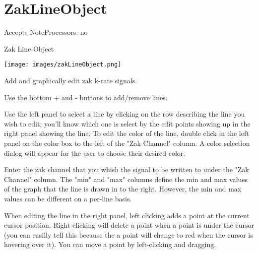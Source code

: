 \section{ZakLineObject}\label{zakLineObject}

Accepts NoteProcessors: no

Zak Line Object

\texttt{[image: images/zakLineObject.png]}

Add and graphically edit zak k-rate signals.

Use the bottom + and - buttons to add/remove lines.

Use the left panel to select a line by clicking on the row describing
the line you wish to edit; you'll know which one is select by the edit
points showing up in the right panel showing the line. To edit the color
of the line, double click in the left panel on the color box to the left
of the "Zak Channel" column. A color selection dialog will appear for
the user to choose their desired color.

Enter the zak channel that you whish the signal to be written to under
the "Zak Channel" column. The "min" and "max" columns define the min and
max values of the graph that the line is drawn in to the right. However,
the min and max values can be different on a per-line basis.

When editing the line in the right panel, left clicking adds a point at
the current cursor position. Right-clicking will delete a point when a
point is under the cursor (you can easilly tell this because the a point
will change to red when the cursor is hovering over it). You can move a
point by left-clicking and dragging.
